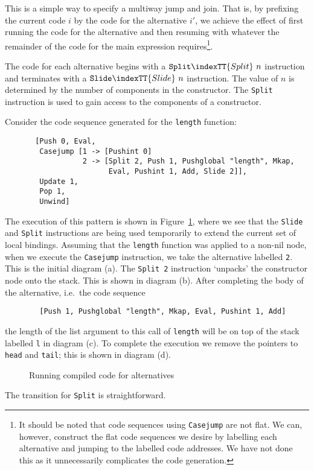This is a simple way to specify a multiway jump and join. That is, by
prefixing the current code $i$ by the code for the alternative $i'$,
we achieve the effect of first running the code for the alternative
and then resuming with whatever the remainder of the code for the main
expression requires\footnote{It should be noted that code sequences
using \mbox{\tt Casejump} are not flat. We can, however, construct the flat
code sequences we desire by labelling each alternative and jumping to
the labelled code addresses. We have not done this as it unnecessarily
complicates the code generation.}.

The code for each alternative begins with a $\mbox{\tt Split}\indexTT{Split}\ n$ instruction
and terminates with a $\mbox{\tt Slide}\indexTT{Slide}\ n$ instruction. The value of $n$ is
determined by the number of components in the constructor. The \mbox{\tt Split}
instruction is used to gain access to the components of a constructor.

Consider the code sequence generated for the \mbox{\tt length} function:
\begin{verbatim}
       [Push 0, Eval,
        Casejump [1 -> [Pushint 0]
                  2 -> [Split 2, Push 1, Pushglobal "length", Mkap,
                        Eval, Pushint 1, Add, Slide 2]],
        Update 1,
        Pop 1,
        Unwind]
\end{verbatim}
The execution of this pattern is shown in Figure~\ref{gm:fg:6alter},
where we see that the \mbox{\tt Slide} and \mbox{\tt Split} instructions are being used
temporarily to extend the current set of local bindings. Assuming that
the \mbox{\tt length} function was applied to a non-nil node, when we execute
the \mbox{\tt Casejump} instruction, we take the alternative labelled \mbox{\tt 2}. This
is the initial diagram (a). The
\mbox{\tt Split\ 2} instruction `unpacks' the constructor node onto the stack.
This is shown in diagram (b). After completing the body of
the alternative, i.e.\ the code sequence
\begin{verbatim}
        [Push 1, Pushglobal "length", Mkap, Eval, Pushint 1, Add]
\end{verbatim}
the length of the list argument to this call of \mbox{\tt length} will be on
top of the stack labelled \mbox{\tt l} in diagram (c).  To
complete the execution we remove the pointers to \mbox{\tt head} and \mbox{\tt tail};
this is shown in diagram (d).
\begin{figure} %

\caption{Running compiled code for alternatives}\label{gm:fg:6alter}
\end{figure}
The transition for \mbox{\tt Split} is straightforward.


